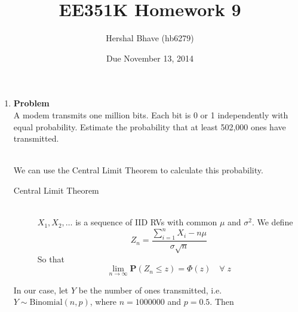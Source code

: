 \documentclass[12pt]{article}
\title{EE351K Homework 9}
\author{Hershal Bhave (hb6279)}
\date{Due November 13, 2014}
\newenvironment{Ex}{\textbf{Problem}\vspace{.75em}\\}{}
\begin{document}
\maketitle
\begin{enumerate}
\item
  \begin{Ex}
    A modem transmits one million bits. Each bit is 0 or 1
    independently with equal probability. Estimate the probability
    that at least 502,000 ones have transmitted.
    \begin{solution} \hfill \vspace{.75em} \\
      We can use the Central Limit Theorem to calculate this
      probability.
      \begin{mdframed}[backgroundcolor=silver]
        \begin{description}
        \item[Central Limit Theorem] \hfill \vspace{.75em} \\
          $X_1, X_2,\ldots$ is a sequence of IID RVs with common $\mu$
          and $\sigma^2$. We define
          $$Z_n=\frac{\sum_{i=1}^n X_i -n\mu}{\sigma\sqrt{n}}$$
          So that
          $$\lim_{n\rightarrow\infty}\mathbf{P}(Z_n\le z) = \Phi(z)
          \quad\forall\; z$$
        \end{description}
      \end{mdframed}
      In our case, let $Y$ be the number of ones transmitted,
      i.e. $Y\sim\text{Binomial}(n,p)$, where $n=1000000$ and
      $p=0.5$. Then


\end{solution}
\end{Ex}
\end{enumerate}
\end{document}
